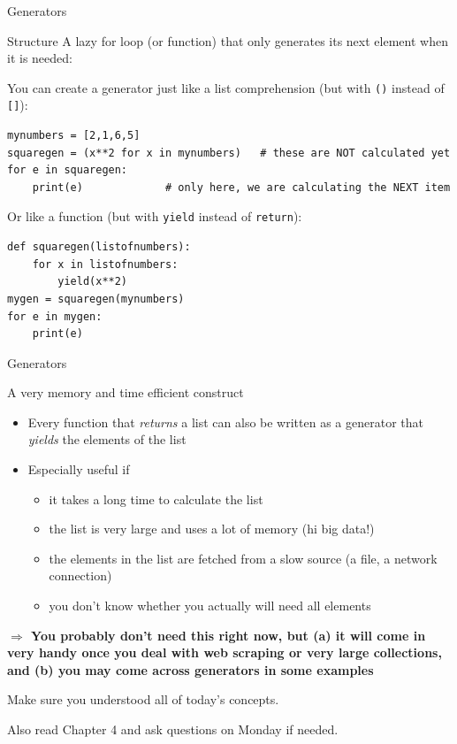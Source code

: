 \documentclass{beamer}
\begin{document}
\begin{frame}[fragile]{Generators}
\begin{block}{Structure}
	A lazy for loop (or function) that only generates its next element when it is needed:
\end{block}
\footnotesize
You can create a generator just like a list comprehension (but with \texttt{()} instead of \texttt{[]}):
\begin{lstlisting}
mynumbers = [2,1,6,5]
squaregen = (x**2 for x in mynumbers)   # these are NOT calculated yet
for e in squaregen:
    print(e)             # only here, we are calculating the NEXT item
\end{lstlisting}
\pause
Or like a function (but with \texttt{yield} instead of \texttt{return}):
\begin{lstlisting}
def squaregen(listofnumbers):
    for x in listofnumbers:
        yield(x**2)
mygen = squaregen(mynumbers)
for e in mygen:
    print(e)
\end{lstlisting}

\end{frame}


\begin{frame}[fragile]{Generators}
	\begin{alertblock}{A very memory and time efficient construct}
		\begin{itemize}
			\item Every function that \emph{returns} a list can also be written as a generator that \emph{yields} the elements of the list
			\item Especially useful if
			\begin{itemize}
				\item it takes a long time to calculate the list
				\item the list is very large and uses a lot of memory (hi big data!)
				\item the elements in the list are fetched from a slow source (a file, a network connection)
				\item you don't know whether you actually will need all elements
			\end{itemize}
		\end{itemize}

		\end{alertblock}
		\textbf{$\Rightarrow$ You probably don't need this right now, but (a) it will come in very handy once you deal with web scraping or very large collections, and (b) you may come across generators in some examples}
		\end{frame}



\begin{frame}[standout]
	Make sure you understood all of today's concepts.
	
	Also read Chapter 4 and ask questions on Monday if needed.

\end{frame}


\end{document}
